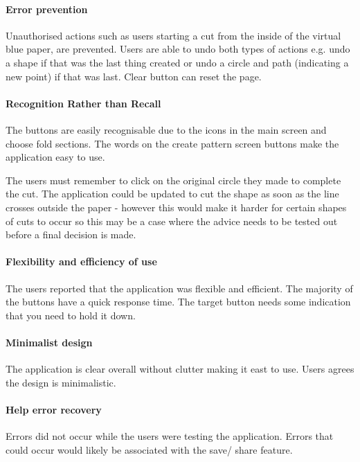 \documentclass[11pt]{article}
\begin{document}
                \paragraph{Error prevention}
                Unauthorised actions such as users starting a cut from the inside of the virtual blue paper, are prevented. Users are able to undo both types of actions e.g. undo a shape if that was the last thing created or undo a circle and path (indicating a new point) if that was last. Clear button can reset the page. 

                \paragraph{Recognition Rather than Recall}
                The buttons are easily recognisable due to the icons in the main screen and choose fold sections. The words on the create pattern screen buttons make the application easy to use. 
                
                The users must remember to click on the original circle they made to complete the cut. The application could be updated to cut the shape as soon as the line crosses outside the paper - however this would make it harder for certain shapes of cuts to occur so this may be a case where the advice needs to be tested out before a final decision is made.


                \paragraph{Flexibility and efficiency of use} 
                The users reported that the application was flexible and efficient. The majority of the buttons have a quick response time. The target button needs some indication that you need to hold it down.

                \paragraph{Minimalist design}
                The application is clear overall without clutter making it east to use. Users agrees the design is minimalistic. 

                \paragraph{Help error recovery}
                Errors did not occur while the users were testing the application. Errors that could occur would likely be associated with the save/ share feature.
\end{document}
